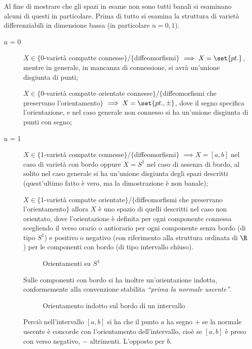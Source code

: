 
Al fine di mostrare che gli spazi in esame non sono tutti banali si esaminano alcuni di questi in particolare.
Prima di tutto si esamina la struttura di varietà differenziabili in dimensione bassa (in particolare $n = 0, 1$).
\begin{description}
\item [n = 0] $X \in \{$0-varietà compatte connesse$\}$/$\{$diffeomorfismi$\}$ $\implies X = \set{pt.}$, mentre in generale, in mancanza di connessione, si avrà un'unione disgiunta di punti;

$X \in \{$0-varietà compatte orientate connesse$\}$/$\{$diffeomorfismi che preservano l'orientamento$\}$ $\implies X = \set{pt., \pm}$, dove il segno specifica l'orientazione, e nel caso generale non connesso si ha un'unione disgiunta di punti con segno;
\item [n = 1] $X \in \{$1-varietà compatte connesse$\}$/$\{$diffeomorfismi$\}$ $\implies X = [a,b]$ nel caso di varietà con bordo oppure $X = S^1$ nel caso di assenza di bordo, al solito nel caso generale si ha un'unione disgiunta degli spazi descritti (quest'ultimo fatto è vero, ma la dimostrazione è non banale);

$X \in \{$1-varietà compatte orientate$\}$/$\{$diffeomorfismi che preservano l'orientamento$\}$ allora $X$ è uno spazio di quelli descritti nel caso non orientato, dove l'orientazione è definita per ogni componente connessa scegliendo il verso orario o antiorario per ogni componente senza bordo (di tipo $S^1$) e positivo o negativo (con riferimento alla struttura ordinata di $\R$) per le componenti con bordo (di tipo intervallo chiuso).

\begin{figure}[h]
\centering

\caption{Orientamenti su $S^1$}
\end{figure}
Sulle componenti con bordo si ha inoltre un'orientazione indotta, conformemente alla convenzione stabilita \emph{``prima la normale uscente''}.
\begin{figure}[h]
\centering

\caption{Orientamento indotto sul bordo di un intervallo}
\end{figure}
Perciò nell'intervallo $[a,b]$ si ha che il punto $a$ ha segno $+$ se la normale uscente è concorde con l'orientamento dell'intervallo, cioè se $[a,b]$ è preso con verso negativo, $-$ altrimenti. L'opposto per $b$.
\end{description}

